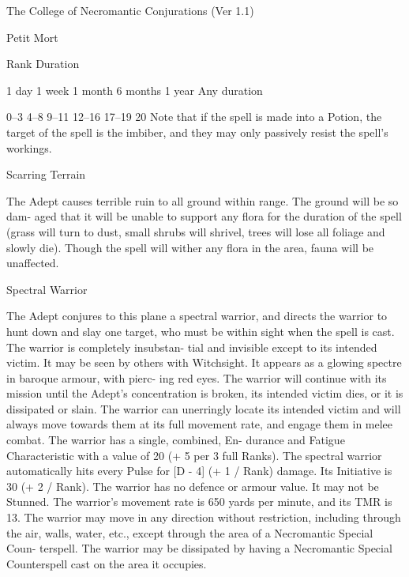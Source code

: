 \begin{Chapter}{The College of Necromantic Conjurations (Ver 1.1)}
\begin{spell}[S-10]{Petit Mort }
\begin{effects}
Rank  Duration 

1 day 
1 week 
1 month 
6 months 
1 year 
Any duration 

0–3 
4–8 
9–11 
12–16 
17–19 
20 
Note  that  if  the  spell  is  made  into  a  Potion,  the 
target of the spell is the imbiber, and they may only 
passively resist the spell’s workings. 

\end{effects}
\end{spell}

\begin{spell}[S-11]{Scarring Terrain }

\begin{effects}
 The  Adept  causes  terrible  ruin  to  all 
ground  within  range.  The  ground  will  be  so  dam-
aged that it will be unable to support any flora for 
the  duration  of  the  spell  (grass  will  turn  to  dust, 
small shrubs will shrivel, trees will lose all foliage 
and  slowly  die).  Though  the  spell  will  wither  any 
flora in the area, fauna will be unaffected. 

\end{effects}
\end{spell}

\begin{spell}[S-12]{Spectral Warrior }

\begin{effects}
The Adept conjures to this plane a spectral 
warrior,  and  directs  the  warrior  to  hunt  down  and 
slay one target, who must be within sight when the 
spell  is  cast.  The  warrior  is  completely  insubstan-
tial  and  invisible  except  to  its  intended  victim.  It 
may  be  seen  by  others  with Witchsight.  It  appears 
as a glowing spectre in baroque armour, with pierc-
ing  red  eyes.  The  warrior  will  continue  with  its 
mission  until  the  Adept’s  concentration  is  broken, 
its intended victim dies, or it is dissipated or slain. 
The  warrior  can  unerringly  locate  its  intended 
victim  and  will  always  move  towards  them  at  its 
full  movement  rate,  and  engage  them  in  melee 
combat.  The  warrior  has  a  single,  combined,  En-
durance and Fatigue Characteristic with a value of 
20  (+  5  per  3  full  Ranks).  The  spectral  warrior 
automatically  hits  every  Pulse  for  [D  -  4]  (+  1  / 
Rank) damage. Its Initiative is 30 (+ 2 / Rank). The 
warrior has no defence or armour value. It may not 
be  Stunned.  The  warrior’s  movement  rate  is  650 
yards  per  minute,  and  its  TMR  is  13.  The  warrior 
may  move  in  any  direction  without  restriction, 
including through the air, walls, water, etc., except 
through  the  area  of  a  Necromantic  Special  Coun-
terspell. The warrior may be dissipated by having a 
Necromantic Special Counterspell cast on the area 
it occupies. 


\end{effects}
\end{spell}
\end{Chapter}
